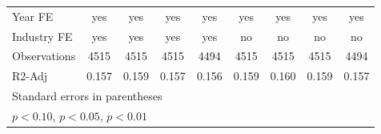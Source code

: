 {\begin{tabular}{l*{8}{c}}
\hline
Year FE             &         yes         &         yes         &         yes         &         yes         &         yes         &         yes         &         yes         &         yes         \\
Industry FE         &         yes         &         yes         &         yes         &         yes         &          no         &          no         &          no         &          no         \\
Observations        &        4515         &        4515         &        4515         &        4494         &        4515         &        4515         &        4515         &        4494         \\
R2-Adj              &       0.157         &       0.159         &       0.157         &       0.156         &       0.159         &       0.160         &       0.159         &       0.157         \\
\hline\hline
\multicolumn{9}{l}{\footnotesize Standard errors in parentheses}\\
\multicolumn{9}{l}{\footnotesize \sym{*} \(p<0.10\), \sym{**} \(p<0.05\), \sym{***} \(p<0.01\)}\\
\end{tabular}
}
